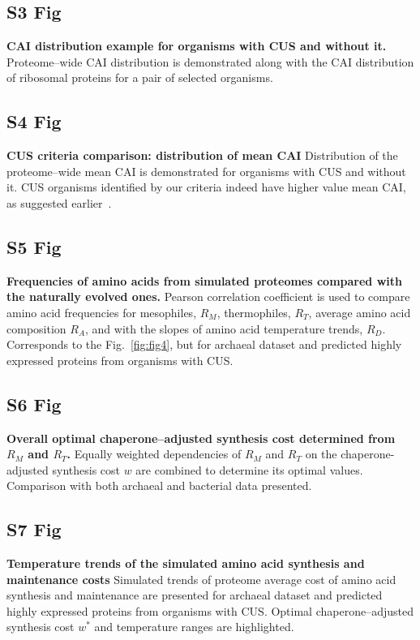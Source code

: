 \documentclass[10pt,letterpaper]{article}
\begin{document}
\subsection*{S3 Fig}
\label{fig:s3}
{\bf CAI distribution example for organisms with CUS and without it.}
Proteome--wide CAI distribution is demonstrated along with the CAI distribution of ribosomal proteins for a pair of selected organisms. 


\subsection*{S4 Fig}
\label{fig:s4}
{\bf CUS criteria comparison: distribution of mean CAI}
Distribution of the proteome--wide mean CAI is demonstrated for organisms with CUS and without it.
CUS organisms identified by our criteria indeed have higher value mean CAI, as suggested earlier~\cite{Botzman2011Variation}.


\subsection*{S5 Fig}
\label{fig:s5}
{\bf Frequencies of amino acids from simulated proteomes compared with the naturally evolved ones.} Pearson correlation coefficient is used to compare amino acid frequencies for mesophiles, $R_M$, thermophiles, $R_T$, average amino acid composition $R_A$, and with the slopes of amino acid temperature trends, $R_D$. Corresponds to the Fig.~\ref{fig:fig4}, but for archaeal dataset and predicted highly expressed proteins from organisms with CUS.



\subsection*{S6 Fig}
\label{fig:s6}
{\bf Overall optimal chaperone--adjusted synthesis cost determined from $R_M$ and $R_T$.}
Equally weighted dependencies of $R_M$ and $R_T$ on the chaperone-adjusted synthesis cost $w$ are combined to determine its optimal values. Comparison with both archaeal and bacterial data presented.


\subsection*{S7 Fig}
\label{fig:s7}
{\bf Temperature trends of the simulated amino acid synthesis and maintenance costs}
Simulated trends of proteome average cost of amino acid synthesis and maintenance are presented for archaeal dataset and predicted highly expressed proteins from organisms with CUS. Optimal chaperone--adjusted synthesis cost $w^*$ and temperature ranges are highlighted.
\end{document}
